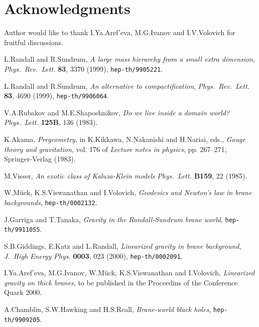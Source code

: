 \documentclass[letterpaper,12pt]{article}
\begin{document}
\section*{Acknowledgments}
Author would like to thank I.Ya.Aref'eva, M.G.Ivanov and
I.V.Volovich for fruitful discussions.

\begin{thebibliography}{99}

L.Randall and R.Sundrum, \emph{A large mass hierarchy from a small
extra dimension}, \emph{Phys.~Rev.~Lett.} \textbf{83}, 3370
(1999), \texttt{hep-th/9905221}.

L.Randall and R.Sundrum, \emph{An alternative to
compactification}, \emph{Phys.~Rev.~Lett.} \textbf{83}, 4690
(1999), \texttt{hep-th/9906064}.

V.A.Rubakov and M.E.Shaposhnikov, \emph{Do we live inside a domain
world?} \emph{Phys.~Lett.} \textbf{125B}, 136 (1983).

K.Akama, \emph{Pregeometry}, in K.Kikkawa, N.Nakanishi and
H.Nariai, eds., \emph{Gauge theory and gravitation}, vol. 176 of
\emph{Lecture notes in physics}, pp. 267--271, Springer-Verlag
(1983).

M.Visser, \emph{An exotic class  of Kaluza-Klein models}
\emph{Phys.~Lett.} \textbf{B159}, 22 (1985).


W.M{\"u}ck, K.S.Viswanathan and I.Volovich, \emph{Geodesics and
Newton's law in brane backgrounds}, \texttt{hep-th/0002132}.

J.Garriga and T.Tanaka, \emph{Gravity in the Randall-Sundrum brane
world},  \texttt{hep-th/9911055}.

S.B.Giddings, E.Katz and L.Randall, \emph{Linearized gravity in
brane background}, \emph{J.~High Energy Phys.} \textbf{0003}, 023
(2000), \texttt{hep-th/0002091}.

I.Ya.Aref'eva, M.G.Ivanov, W.M{\"u}ck, K.S.Viswanathan and
I.Volovich, \emph{Linearized gravity on thick branes}, to be
published  in the Proceedins of the Conference Quark 2000.

A.Chamblin, S.W.Hawking and H.S.Reall, \emph{Brane-world black
holes}, \texttt{hep-th/9909205}.

\end{thebibliography}
\end{document}
